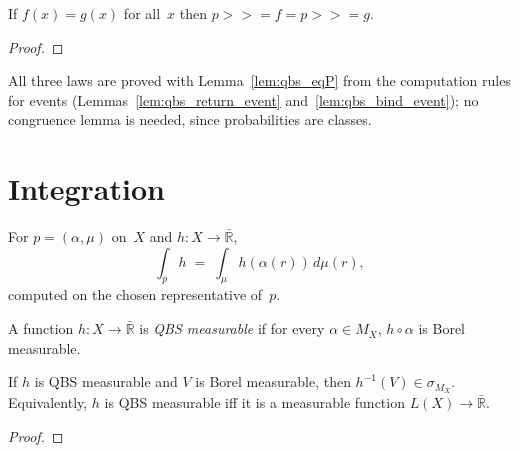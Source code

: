 \begin{lemma}\label{lem:eq_qbs_bind}
  \rocqok
  If $f(x) = g(x)$ for all~$x$ then
  $p \mathbin{>\!\!>\!\!=} f = p \mathbin{>\!\!>\!\!=} g$.
\end{lemma}
\begin{proof}\rocqok\end{proof}

All three laws are proved with Lemma~\ref{lem:qbs_eqP} from the
computation rules for events (Lemmas~\ref{lem:qbs_return_event}
and~\ref{lem:qbs_bind_event}); no congruence lemma is needed, since
probabilities are classes.


\section{Integration}\label{sec:integration}

\begin{definition}\label{def:qbs_integral}
  \rocqok
  For $p = (\alpha, \mu)$ on~$X$ and $h : X \to \bar{\mathbb{R}}$,
  \[
    \int_p h \;=\; \int_\mu h(\alpha(r))\, d\mu(r),
  \]
  computed on the chosen representative of~$p$.
\end{definition}

\begin{definition}\label{def:qbs_measurable}
  \rocqok
  A function $h : X \to \bar{\mathbb{R}}$ is \emph{QBS measurable} if
  for every $\alpha \in M_X$, $h \circ \alpha$ is Borel measurable.
\end{definition}

\begin{lemma}\label{lem:qbs_measurable_sigma_Mx}
  \rocqok
  If $h$ is QBS measurable and $V$ is Borel measurable, then
  $h^{-1}(V) \in \sigma_{M_X}$. Equivalently, $h$ is QBS measurable iff it
  is a measurable function $L(X) \to \bar{\mathbb{R}}$.
\end{lemma}
\begin{proof}\rocqok\end{proof}

